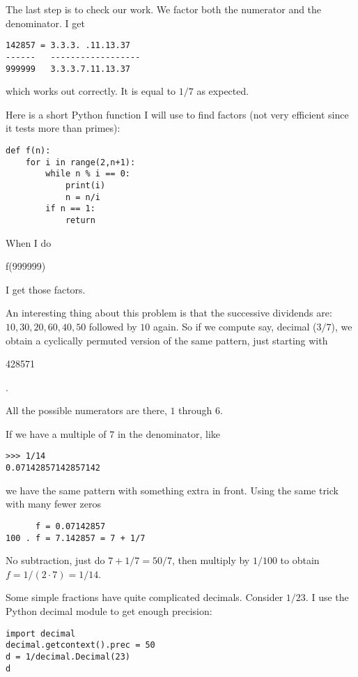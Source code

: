 \documentclass[11pt, oneside]{article}
\begin{document}
The last step is to check our work.  We factor both the numerator and the denominator.  I get

\begin{verbatim}
142857 = 3.3.3. .11.13.37
------   ------------------
999999   3.3.3.7.11.13.37
\end{verbatim}

which works out correctly.  It is equal to $1/7$ as expected.

Here is a short Python function I will use to find factors (not very efficient since it tests more than primes):

\begin{verbatim}
def f(n):
    for i in range(2,n+1):
        while n % i == 0:
            print(i)
            n = n/i
        if n == 1:
            return
\end{verbatim}

When I do \begin{tt}{f(999999)}\end{tt} I get those factors.

An interesting thing about this problem is that the successive dividends are:  $10,30,20,60,40,50$ followed by $10$ again.  So if we compute say, decimal ($3/7$), we obtain a cyclically permuted version of the same pattern, just starting with \begin{tt}{428571}\end{tt} .  

All the possible numerators are there, $1$ through $6$.

If we have a multiple of $7$ in the denominator, like 

\begin{verbatim}
>>> 1/14
0.07142857142857142
\end{verbatim}

we have the same pattern with something extra in front.  Using the same trick with many fewer zeros

\begin{verbatim}
      f = 0.07142857
100 . f = 7.142857 = 7 + 1/7
 \end{verbatim}
 
No subtraction, just do $7 + 1/7 = 50/7$, then multiply by $1/100$ to obtain $f = 1/(2 \cdot 7) = 1/14$.

Some simple fractions have quite complicated decimals.  Consider $1/23$.  I use the Python decimal module to get enough precision:

\begin{verbatim}
import decimal
decimal.getcontext().prec = 50
d = 1/decimal.Decimal(23)
d
\end{verbatim}
\end{document}
